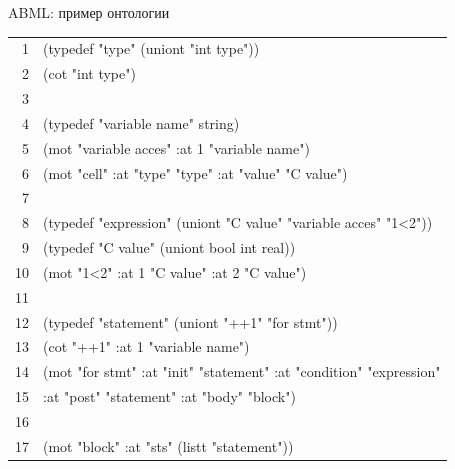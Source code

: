 \documentclass[aspectratio=169, 11pt]{beamer}
\newcommand{\AK}[1]{\textcolor{acslkw}{#1}}   %
\newcommand{\AT}[1]{\textcolor{acslty}{#1}}   %
\newcommand{\AI}[1]{\textcolor{acslid}{#1}}   %
\newcommand{\AN}[1]{\textcolor{acslnm}{#1}}   %
\newcommand{\AbmlP}[1]{\textcolor{abmlat}{#1}}   %
\newcommand{\AbmlS}[1]{\textcolor{abmlstr}{#1}}   %
\begin{document}
\begin{frame}[fragile]{ABML: пример онтологии}
	\ttfamily\small
	\setlength{\baselineskip}{1.15em}
	\setlength{\parindent}{0pt}
	
	\begingroup
	\setlength{\fboxsep}{0pt}%
	\colorbox{codebg}{%
		\begin{minipage}{\linewidth}
			\vspace{6pt}%
			\hspace{8pt}%
			\begin{tabular}{@{}r@{\hspace{1.2em}}l@{}}
				\textcolor{ln}{1} & (\AK{typedef} \AbmlS{"type"} (\AI{uniont} \AbmlS{"int type"})) \\
				\textcolor{ln}{2} & (\AK{cot} \AbmlS{"int type"}) \\
				\textcolor{ln}{3} & \\
				\textcolor{ln}{4} & (\AK{typedef} \AbmlS{"variable name"} \AT{string}) \\
				\textcolor{ln}{5} & (\AK{mot} \AbmlS{"variable acces"} \AbmlP{:at} \AN{1} \AbmlS{"variable name"}) \\
				\textcolor{ln}{6} & (\AK{mot} \AbmlS{"cell"} \AbmlP{:at} \AbmlS{"type"} \AbmlS{"type"} \AbmlP{:at} \AbmlS{"value"} \AbmlS{"C value"}) \\
				\textcolor{ln}{7} & \\
				\textcolor{ln}{8} & (\AK{typedef} \AbmlS{"expression"} (\AI{uniont} \AbmlS{"C value"} \AbmlS{"variable acces"} \AbmlS{"1<2"})) \\
				\textcolor{ln}{9} & (\AK{typedef} \AbmlS{"C value"} (\AI{uniont} \AT{bool} \AT{int} \AT{real})) \\
				\textcolor{ln}{10} & (\AK{mot} \AbmlS{"1<2"} \AbmlP{:at} \AN{1} \AbmlS{"C value"} \AbmlP{:at} \AN{2} \AbmlS{"C value"}) \\
				\textcolor{ln}{11} & \\
				\textcolor{ln}{12} & (\AK{typedef} \AbmlS{"statement"} (\AI{uniont} \AbmlS{"++1"} \AbmlS{"for stmt"})) \\
				\textcolor{ln}{13} & (\AK{cot} \AbmlS{"++1"} \AbmlP{:at} \AN{1} \AbmlS{"variable name"}) \\
				\textcolor{ln}{14} & (\AK{mot} \AbmlS{"for stmt"} \AbmlP{:at} \AbmlS{"init"} \AbmlS{"statement"} \AbmlP{:at} \AbmlS{"condition"} \AbmlS{"expression"} \\
				\textcolor{ln}{15} & \hspace{8em}\AbmlP{:at} \AbmlS{"post"} \AbmlS{"statement"} \AbmlP{:at} \AbmlS{"body"} \AbmlS{"block"}) \\
				\textcolor{ln}{16} & \\
				\textcolor{ln}{17} & (\AK{mot} \AbmlS{"block"} \AbmlP{:at} \AbmlS{"sts"} (\AI{listt} \AbmlS{"statement"})) \\
			\end{tabular}
			\hspace{8pt}%
			\vspace{4pt}%
		\end{minipage}%
	}%
	\endgroup
\end{frame}
\end{document}
